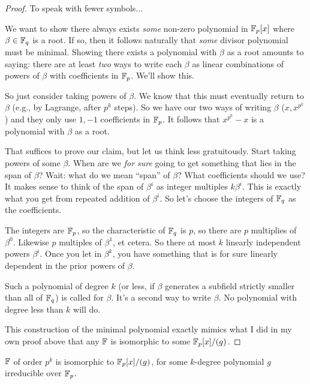 \begin{proof}
  To speak with fewer symbols...

  We want to show there always exists \emph{some} non-zero polynomial in
  $\mathbb{F}_p[x]$ where $\beta\in\mathbb{F}_q$ is a root. If so, then it follows
  naturally that \emph{some} divisor polynomial must be minimal. Showing
  there exists a polynomial with $\beta$ as a root amounts to saying:
  there are at least \emph{two} ways to write each $\beta$ as linear
  combinations of powers of $\beta$ with coefficients in $\mathbb{F}_p$. We'll
  show this.

  So just consider taking powers of $\beta$. We know that this must
  eventually return to $\beta$ (e.g., by Lagrange, after $p^k$ steps).
  So we have our two ways of writing $\beta$ ($x, x^{p^k}$) and they
  only use $1, -1$ coefficients in $\mathbb{F}_p$. It follows that $x^{p^k} - x$
  is a polynomial with $\beta$ as a root.

  That suffices to prove our claim, but let us think less gratuitously.
  Start taking powers of some $\beta$. When are we \emph{for sure} going
  to get something that lies in the span of $\beta$? Wait: what do we
  mean ``span'' of $\beta$? What coefficients should we use? It makes
  sense to think of the span of $\beta^i$ as integer multiples
  $k\beta^i$. This is exactly what you get from repeated addition of
  $\beta^i$. So let's choose the integers of $\mathbb{F}_q$ as the coefficients.

  The integers are $\mathbb{F}_p$, so the characteristic of $\mathbb{F}_q$ is $p$, so
  there are $p$ multiplies of $\beta^0$. Likewise $p$ multiples of
  $\beta^1$, et cetera. So there at most $k$ linearly independent powers
  $\beta^i$. Once you let in $\beta^k$, you have something that is for
  sure linearly dependent in the prior powers of $\beta$.

  Such a polynomial of degree $k$ (or less, if $\beta$ generates a
  subfield strictly smaller than all of $\mathbb{F}_q$) is called
   for $\beta$. It's a second way to write $\beta$. No
  polynomial with degree less than $k$ will do.

  This construction of the minimal polynomial exactly mimics what I did
  in my own proof above that any $\mathbb{F}$ is isomorphic to some $\mathbb{F}_p[x]/(g)$.
\end{proof}

\begin{theorem}
  $\mathbb{F}$ of order $p^k$ is isomorphic to $\mathbb{F}_p[x]/(g)$, for some $k$-degree
  polynomial $g$ irreducible over $\mathbb{F}_p$.
\end{theorem}

